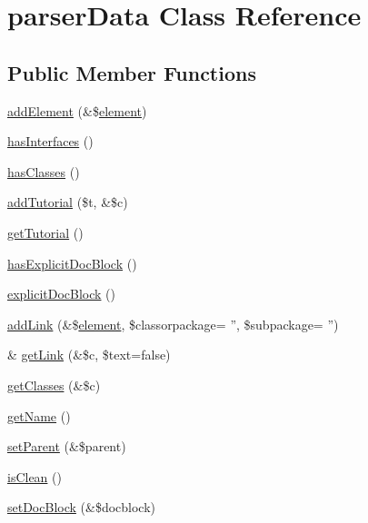 \hypertarget{classparser_data}{\section{parser\-Data \-Class \-Reference}
\label{classparser_data}
}
\subsection*{\-Public \-Member \-Functions}
\begin{DoxyCompactItemize}
\item 
\hyperlink{classparser_data_ab5f1a0d0aa831fc71d6e5dae4dbffea7}{add\-Element} (\&\$\hyperlink{bug-904820_8php_aa94081298ab2dfd0f261cce6c203d9aa}{element})
\item 
\hyperlink{classparser_data_ad8a516c9d1294cf166daa14598b1f299}{has\-Interfaces} ()
\item 
\hyperlink{classparser_data_a30baa1aaa2847cfd89806cebd05d2d49}{has\-Classes} ()
\item 
\hyperlink{classparser_data_a116fb717ca229f334cb23c2a9e6fd8ba}{add\-Tutorial} (\$t, \&\$c)
\item 
\hyperlink{classparser_data_a715fae8f190b69fed3659b0d836c5477}{get\-Tutorial} ()
\item 
\hyperlink{classparser_data_a4588df4a586422db84714bcc691e6473}{has\-Explicit\-Doc\-Block} ()
\item 
\hyperlink{classparser_data_a1f6450c99cddc8c14abd8cd23d0f0b77}{explicit\-Doc\-Block} ()
\item 
\hyperlink{classparser_data_a15fa5999fcbfeb583e7604f25b196bcc}{add\-Link} (\&\$\hyperlink{bug-904820_8php_aa94081298ab2dfd0f261cce6c203d9aa}{element}, \$classorpackage= '', \$subpackage= '')
\item 
\& \hyperlink{classparser_data_ade2f9683302eda691c9f0f0b602396d9}{get\-Link} (\&\$c, \$text=false)
\item 
\hyperlink{classparser_data_ae02fd673b9428df80c95e5889f446e99}{get\-Classes} (\&\$c)
\item 
\hyperlink{classparser_data_a3d0963e68bb313b163a73f2803c64600}{get\-Name} ()
\item 
\hyperlink{classparser_data_a385f43b445dadeaca12cb14abc385087}{set\-Parent} (\&\$parent)
\item 
\hyperlink{classparser_data_a001264a1fee8d2370c57b6db1ab8023f}{is\-Clean} ()
\item 
\hyperlink{classparser_data_ac93117ef054a771ef21adeabdc5c512f}{set\-Doc\-Block} (\&\$docblock)
\end{DoxyCompactItemize}
